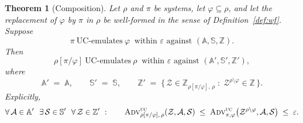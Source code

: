 \documentclass[11pt,a4paper]{article}
\newcommand{\Zenv}{\mathcal{Z}}
\newcommand{\Adv}{\mathcal{A}}
\newcommand{\Sim}{\mathcal{S}}
\newcommand{\advtg}{\op{Adv}}
\newcommand{\Aset}{\mathbb{A}}
\newcommand{\SimSet}{\mathbb{S}}
\newcommand{\ZenvSet}{\mathbb{Z}}
\newcommand{\op}[1]{\textsc{#1}}
\theoremstyle{accentdef}
\theoremstyle{accentplain}
\newtheorem{theorem}[definition]{Theorem}
\begin{document}
\begin{theorem}[Composition]\label{thm:comp}
Let $\rho$ and $\pi$ be systems, let $\varphi \subseteq \rho$, and let the replacement of
$\varphi$ by $\pi$ in $\rho$ be
well-formed in the sense of Definition~\ref{def:wf}. Suppose
\[
  \pi \ \text{UC-emulates} \ \varphi \ \text{ within } \varepsilon \text{ against } (\Aset,\SimSet,\ZenvSet) .
\]
Then
\[
  \rho[\pi/\varphi] \ \text{UC-emulates} \ \rho \ \text{ within } \varepsilon \text{ against } (\Aset',\SimSet',\ZenvSet') ,
\]
where
\[
  \Aset' \;=\; \Aset, \qquad
  \SimSet' \;=\; \SimSet, \qquad
  \ZenvSet' \;=\; \bigl\{\, \Zenv \in \ZenvSet_{\rho[\pi/\varphi],\,\rho} \;:\; \Zenv^{\rho \setminus \varphi} \in \ZenvSet \,\bigr\} .
\]
Explicitly,
\[
  \forall\, \Adv \in \Aset' \ \ \exists\, \Sim \in \SimSet' \ \ \forall\, \Zenv \in \ZenvSet' \ : \qquad
  \advtg^{\op{uc}}_{\rho[\pi/\varphi],\,\rho}(\Zenv,\Adv,\Sim)
  \;\leq\;
  \advtg^{\op{uc}}_{\pi,\varphi}\bigl(\Zenv^{\rho \setminus \varphi},\Adv,\Sim\bigr)
  \;\leq\; \varepsilon .
\]
\end{theorem}
\end{document}
